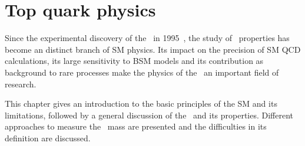 \chapter{Top quark physics}
\label{chap:topphysics}
%
Since the experimental discovery of the \tquark\ in 1995~\cite{PhysRevLett.74.2626,Abachi:1995iq}, the study of \tquark\ properties has become an distinct branch of \gls{SM} physics. 
%
Its impact on the precision of \gls{SM} \gls{QCD} calculations, its large sensitivity to \gls{BSM} models and its contribution as background to rare processes make the physics of the \tquark\ an important field of research. 

This chapter gives an introduction to the basic principles of the \gls{SM} and its limitations, followed by a general discussion of the \tquark\ and its properties. Different approaches to measure the \tquark\ mass are presented and the difficulties in its definition are discussed.








